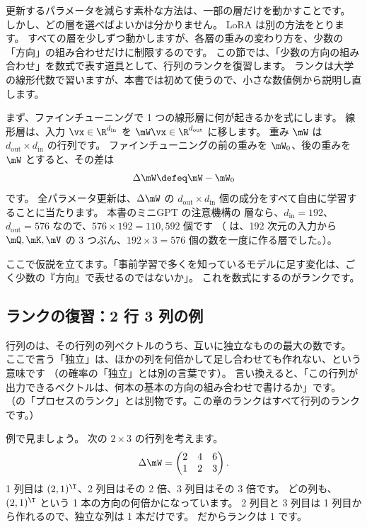 更新するパラメータを減らす素朴な方法は、一部の層だけを動かすことです。
しかし、どの層を選べばよいかは分かりません。
LoRA は別の方法をとります。
すべての層を少しずつ動かしますが、各層の重みの変わり方を、少数の「方向」の組み合わせだけに制限するのです。
この節では、「少数の方向の組み合わせ」を数式で表す道具として、行列のランクを復習します。
ランクは大学の線形代数で習いますが、本書では初めて使うので、小さな数値例から説明し直します。

まず、ファインチューニングで 1 つの線形層に何が起きるかを式にします。
線形層は、入力 $\vx\in\R^{d_{\text{in}}}$ を $\mW\vx\in\R^{d_{\text{out}}}$ に移します。
重み $\mW$ は $d_{\text{out}}\times d_{\text{in}}$ の行列です。
ファインチューニングの前の重みを $\mW_0$、後の重みを $\mW$ とすると、その差は
\begin{equation}
\Delta\mW \defeq \mW - \mW_0
\label{eq:lora-delta}
\end{equation}
です。
全パラメータ更新は、$\Delta\mW$ の $d_{\text{out}}\times d_{\text{in}}$ 個の成分をすべて自由に学習することに当たります。
本書のミニGPT の注意機構の  層なら、$d_{\text{in}}=192$、$d_{\text{out}}=576$ なので、$576\times192=110{,}592$ 個です
（ は、192 次元の入力から $\mQ,\mK,\mV$ の 3 つぶん、$192\times3=576$ 個の数を一度に作る層でした。）。

ここで仮説を立てます。「事前学習で多くを知っているモデルに足す変化は、ごく少数の『方向』で表せるのではないか」。
これを数式にするのがランクです。

\subsection{ランクの復習：2 行 3 列の例}\label{sec:lora-rank-review}

行列のは、その行列の列ベクトルのうち、互いに独立なものの最大の数です。
ここで言う「独立」は、ほかの列を何倍かして足し合わせても作れない、という意味です
（の確率の「独立」とは別の言葉です）。
言い換えると、「この行列が出力できるベクトルは、何本の基本の方向の組み合わせで書けるか」です。
（の「プロセスのランク」とは別物です。この章のランクはすべて行列のランクです。）

例で見ましょう。
次の $2\times3$ の行列を考えます。
\[
\Delta\mW=\begin{pmatrix}2 & 4 & 6\\ 1 & 2 & 3\end{pmatrix}.
\]
1 列目は $(2,1)^\T$、2 列目はその 2 倍、3 列目はその 3 倍です。
どの列も、$(2,1)^\T$ という 1 本の方向の何倍かになっています。
2 列目と 3 列目は 1 列目から作れるので、独立な列は 1 本だけです。
だからランクは 1 です。

